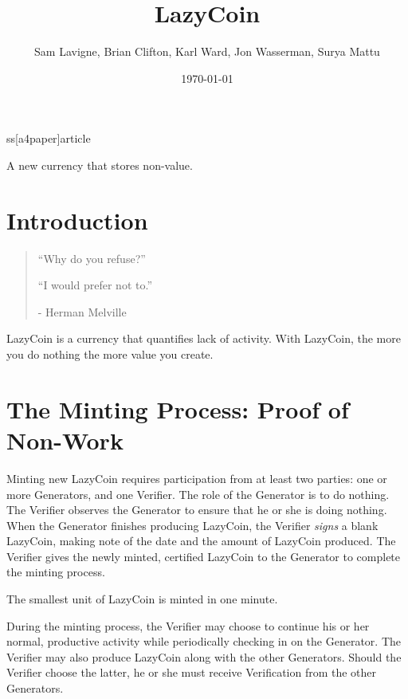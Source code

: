 ss[a4paper]{article}

\usepackage[english]{babel}
\usepackage[utf8]{inputenc}
\usepackage{amsmath}
\usepackage{graphicx}
\usepackage[colorinlistoftodos]{todonotes}

\title{LazyCoin}

\author{Sam Lavigne, Brian Clifton, Karl Ward, Jon Wasserman, Surya Mattu}

\date{\today}


\maketitle

\abstract
A new currency that stores non-value.


\section{Introduction}

\begin{quote}
``Why do you refuse?''

``I would prefer not to.''

- Herman Melville
\end{quote}


LazyCoin is a currency that quantifies lack of activity. With LazyCoin, the more you do nothing the more value you create. 


\section{The Minting Process: Proof of Non-Work}

Minting new LazyCoin requires participation from at least two parties: one or more Generators, and one Verifier. The role of the Generator is to do nothing. The Verifier observes the Generator to ensure that he or she is doing nothing. When the Generator finishes producing LazyCoin, the Verifier \textit{signs} a blank LazyCoin, making note of the date and the amount of LazyCoin produced. The Verifier gives the newly minted, certified LazyCoin to the Generator to complete the minting process. 

The smallest unit of LazyCoin is minted in one minute.

During the minting process, the Verifier may choose to continue his or her normal, productive activity while periodically checking in on the Generator. The Verifier may also produce LazyCoin along with the other Generators. Should the Verifier choose the latter, he or she must receive Verification from the other Generators.

